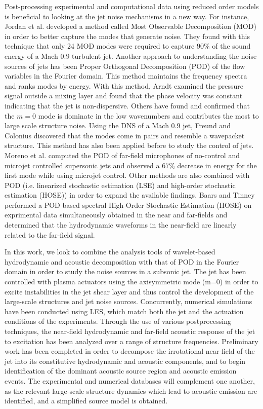 \documentclass[english]{aiaa-tc}
\begin{document}
Post-processing experimental and computational data using reduced order models is beneficial to looking at the jet noise mechanisms in a new way.
 For instance, Jordan et al.\cite{jordan2007} developed a method called Most Observable Decomposition (MOD) in order to better capture the modes that generate noise. They found with this technique that only 24 MOD modes were required to capture $90\%$ of the sound energy of a Mach $0.9$ turbulent jet. 
Another approach to understanding the noise sources of jets has been Proper Orthogonal Decomposition (POD) of the flow variables in the Fourier domain. This method maintains the frequency spectra and ranks modes by energy. 
With this method, Arndt\cite{Arndt1997} examined the pressure signal outside a mixing layer and found that the phase velocity was constant indicating that the jet is non-dispersive.  
Others have found and confirmed that the $m=0$ mode is dominate in the low wavenumbers and contributes the most to large scale structure noise.\cite{hall2007,tinney2007}  
Using the DNS of a Mach 0.9 jet, Freund and Colonius\cite{freund2002} discovered that the modes come in pairs and resemble a wavepacket structure.
This method has also been applied before to study the control of jets. Moreno et al.\cite{moreno2003} computed the POD of far-field microphones of no-control and microjet controlled supersonic jets and observed a  $67\%$ decrease in energy for the first mode while using microjet control.
Other methods are also combined with POD (i.e. linearized stochastic estimation (LSE) and high-order stochastic estimation (HOSE)) in order to expand the available findings. Baars and Tinney\cite{baars2010} performed a POD based spectral High-Order Stochastic Estimation (HOSE) on exprimental data simultaneously obtained in the near and far-fields and determined that the hydrodynamic waveforms in the near-field are linearly related to the far-field signal. 

In this work, we look to combine the analysis tools of wavelet-based hydrodynamic and acoustic decomposition with that of POD in the Fourier domain in order to study the noise sources in a subsonic jet. 
The jet has been controlled with plasma actuators using the axisymmetric mode (m=0) in order to excite instabilities in the jet shear layer and thus control the development of the large-scale structures and jet noise sources. Concurrently, numerical simulations have been conducted using LES, which match both the jet and the actuation conditions of the experiments. Through the use of various postprocessing techniques, the near-field hydrodynamic and far-field acoustic response of the jet to excitation has been analyzed over a range of structure frequencies. Preliminary work has been completed in order to decompose the irrotational near-field of the jet into its constitutive hydrodynamic and acoustic components, and to begin identification of the dominant acoustic source region and acoustic emission events. The experimental and numerical databases will complement one another, as the relevant large-scale structure dynamics which lead to acoustic emission are identified, and a simplified source model is obtained. 
\end{document}
